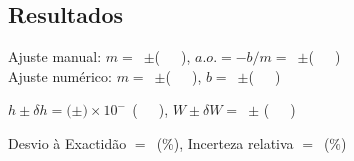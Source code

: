 \documentclass[a4paper,12pt]{article}  %
\begin{document}
\subsection{\sf Resultados}
\noindent Ajuste manual:  $m =$~\underline{\makebox[2cm][r]{~}}$\pm$\underline{\makebox[2cm][r]{~}}(~~~), 
$a.o.= -b/m=$~\underline{\makebox[2cm][r]{~}}$\pm$\underline{\makebox[2cm][r]{~}}(~~~) 
\\
\noindent Ajuste numérico:  $m=$~\underline{\makebox[2cm][r]{~}}$\pm$\underline{\makebox[2cm][r]{~}}(~~~), 
$b=$~\underline{\makebox[2cm][r]{~}}$\pm$\underline{\makebox[2cm][r]{~}}(~~~) 

\noindent  $h\pm \delta h=($\underline{\makebox[2cm][r]{~}}$\pm$\underline{\makebox[2cm][r]{~}}$)\times 10^{-\,}$ \underline{\makebox[0.5cm][r]{~}}(~~~), 
$W \pm \delta W=$~\underline{\makebox[1.5cm][r]{~}}$\pm$\underline{\makebox[1.5cm][r]{~}} (~~~) 

\noindent  Desvio à Exactidão $=$~\underline{\makebox[1.5cm][r]{~}}(\%), 
Incerteza relativa $=$~\underline{\makebox[1.5cm][r]{~}}($\%$) 
\end{document}
